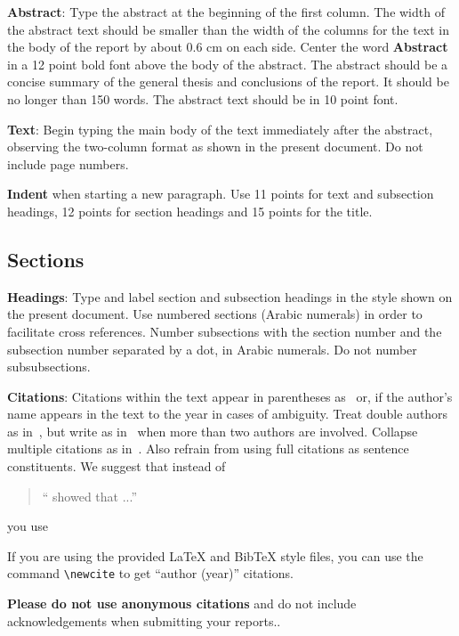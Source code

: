 \documentclass[11pt]{article}
\begin{document}
{\bf Abstract}: Type the abstract at the beginning of the first
column. The width of the abstract text should be smaller than the
width of the columns for the text in the body of the report by about
0.6 cm on each side. Center the word {\bf Abstract} in a 12 point bold
font above the body of the abstract. The abstract should be a concise
summary of the general thesis and conclusions of the report. It should
be no longer than 150 words. The abstract text should be in 10 point font.

{\bf Text}: Begin typing the main body of the text immediately after
the abstract, observing the two-column format as shown in 
the present document. Do not include page numbers.

{\bf Indent} when starting a new paragraph. Use 11 points for text and 
subsection headings, 12 points for section headings and 15 points for
the title. 

\subsection{Sections}

{\bf Headings}: Type and label section and subsection headings in the
style shown on the present document.  Use numbered sections (Arabic
numerals) in order to facilitate cross references. Number subsections
with the section number and the subsection number separated by a dot,
in Arabic numerals. Do not number subsubsections.

{\bf Citations}: Citations within the text appear in parentheses
as~\cite{Gusfield:97} or, if the author's name appears in the text
to the year in cases of ambiguity.  Treat double authors as
in~\cite{Aho:72}, but write as in~\cite{Chandra:81} when more than two
authors are involved. Collapse multiple citations as
in~\cite{Gusfield:97,Aho:72}. Also refrain from using full citations
as sentence constituents. We suggest that instead of
\begin{quote}
  ``\cite{Gusfield:97} showed that ...''
\end{quote}
you use
\begin{quote}
\end{quote}

If you are using the provided \LaTeX{} and Bib\TeX{} style files, you
can use the command \verb|\newcite| to get ``author (year)'' citations.

\textbf{Please do not use anonymous citations} and do not include
acknowledgements when submitting your reports..
\end{document}

